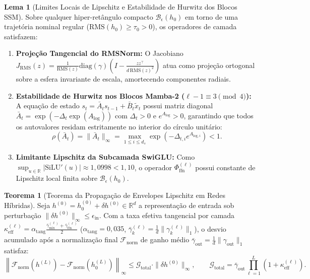\documentclass[11pt,a4paper]{article}
\theoremstyle{definition}
\newtheorem{theorem}{Teorema}
\newtheorem{lemma}{Lema}
\begin{document}
\begin{lemma}[Limites Locais de Lipschitz e Estabilidade de Hurwitz dos Blocos SSM]
\label{lem:local_lipschitz}
Sobre qualquer hiper-retângulo compacto $\mathcal{B}_{\epsilon}(h_0)$ em torno de uma trajetória nominal regular ($\text{RMS}(h_0) \ge \tau_0 > 0$), os operadores de camada satisfazem:
\begin{enumerate}
    \item \textbf{Projeção Tangencial do RMSNorm:} O Jacobiano $J_{\text{RMS}}(z) = \frac{1}{\text{RMS}(z)}\text{diag}(\gamma)\left(I - \frac{z z^\top}{d\,\text{RMS}(z)^2}\right)$ atua como projeção ortogonal sobre a esfera invariante de escala, amortecendo componentes radiais.
    \item \textbf{Estabilidade de Hurwitz nos Blocos Mamba-2 ($\ell-1 \equiv 3 \pmod 4$):} A equação de estado $s_t = \bar{A}_t s_{t-1} + \bar{B}_t \tilde{x}_t$ possui matriz diagonal $\bar{A}_t = \exp(-\Delta_t \exp(A_{\text{log}}))$ com $\Delta_t > 0$ e $e^{A_{\text{log}}} > 0$, garantindo que todos os autovalores residam estritamente no interior do círculo unitário:
    \begin{equation}
        \rho(\bar{A}_t) = \|\bar{A}_t\|_\infty = \max_{1 \le i \le d_s} \exp\!\left(-\Delta_{t,i} e^{A_{\text{log},i}}\right) < 1.
    \end{equation}
    \item \textbf{Limitante Lipschitz da Subcamada SwiGLU:} Como $\sup_{u \in \mathbb{R}} |\text{SiLU}'(u)| \approx 1{,}0998 < 1{,}10$, o operador $\Phi_{\text{ffn}}^{(\ell)}$ possui constante de Lipschitz local finita sobre $\mathcal{B}_\epsilon(h_0)$.
\end{enumerate}
\end{lemma}

\begin{theorem}[Teorema da Propagação de Envelopes Lipschitz em Redes Híbridas]
\label{thm:lipschitz_propagation}
Seja $h^{(0)} = h_0^{(0)} + \delta h^{(0)} \in \mathbb{R}^d$ a representação de entrada sob perturbação $\|\delta h^{(0)}\|_\infty \le \epsilon_{\text{in}}$. Com a taxa efetiva tangencial por camada $\kappa_{\text{eff}}^{(\ell)} = \alpha_{\text{tang}} \frac{\bar{\gamma}_{\text{mix}}^{(\ell)} + \bar{\gamma}_{\text{ffn}}^{(\ell)}}{2}$ ($\alpha_{\text{tang}} = 0{,}035$, $\bar{\gamma}_k^{(\ell)} = \frac{1}{d}\|\gamma_k^{(\ell)}\|_1$), o desvio acumulado após a normalização final $\mathcal{F}_{\text{norm}}$ de ganho médio $\bar{\gamma}_{\text{out}} = \frac{1}{d}\|\gamma_{\text{out}}\|_1$ satisfaz:
\begin{equation}
    \left\|\mathcal{F}_{\text{norm}}(h^{(L)}) - \mathcal{F}_{\text{norm}}(h_0^{(L)})\right\|_\infty \le \mathcal{G}_{\text{total}} \cdot \|\delta h^{(0)}\|_\infty, \qquad \mathcal{G}_{\text{total}} = \bar{\gamma}_{\text{out}} \prod_{\ell=1}^{L} \left(1 + \kappa_{\text{eff}}^{(\ell)}\right).
\end{equation}
\end{theorem}
\end{document}
